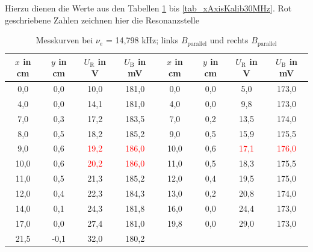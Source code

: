 Hierzu dienen die Werte aus den Tabellen \ref{tab_xAxisKalib15MHz} bis
\ref{tab_xAxisKalib30MHz}. Rot geschriebene Zahlen zeichnen hier die Resonanzstelle
\renewcommand{\arraystretch}{1.2}
\begin{table}[H]
 \begin{tabular}{c|c|c|c||c|c|c|c}
  $x$ in cm & $y$ in cm & $U_\text{R}$ in V & $U_\text{B} $ in mV & $x$ in cm & $y$ in cm & $U_\text{R}$ in V & $U_\text{B}$ in mV \\
 \hline
 0,0&	0,0&	10,0&	181,0&	0,0&	0,0&		5,0&	173,0\\
4,0&	0,0&	14,1&	181,0&	4,0&	0,0&		9,8&	173,0\\
7,0&	0,3&	17,2&	183,5&	7,0&	0,2&		13,5&	174,0\\
8,0&	0,5&	18,2&	185,2&	9,0&	0,5&		15,9&	175,5\\
9,0&	0,6&	\textcolor{red}{19,2}&	\textcolor{red}{186,0}&	10,0&	0,6&		\textcolor{red}{17,1}&	\textcolor{red}{176,0}\\
10,0&	0,6&	\textcolor{red}{20,2}&	\textcolor{red}{186,0}&	11,0&	0,5&		18,3&	175,5\\
11,0&	0,5&	21,3&	185,2&	12,0&	0,4&		19,5&	175,0\\
12,0&	0,4&	22,3&	184,3&	13,0&	0,2&		20,8&	174,0\\
14,0&	0,1&	24,3&	181,8&	16,0&	0,0&		24,4&	173,0\\
17,0&	0,0&	27,4&	181,0&	19,8&	0,0&		29,0&	173,0\\ 
21,5&	-0,1&	32,0&	180,2&	&	&		&	\\

 \end{tabular}
 \caption{Messkurven bei $\nu_e$ = 14,798 kHz; links $B_\text{parallel}$ und rechts $B_\text{parallel}$}
 \label{tab_xAxisKalib15MHz}
\end{table}
